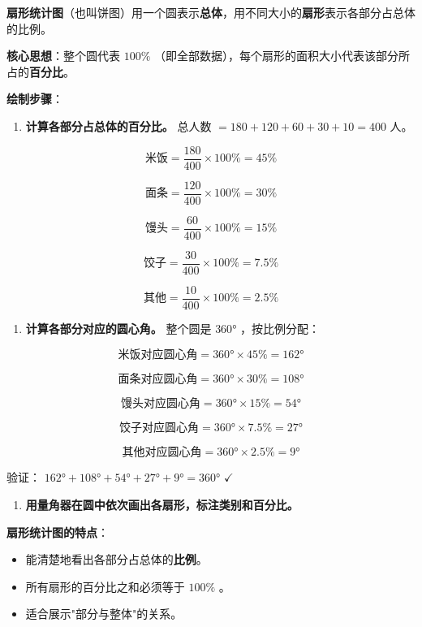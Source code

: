 \begin{understand}


\textbf{扇形统计图}（也叫饼图）用一个圆表示\textbf{总体}，用不同大小的\textbf{扇形}表示各部分占总体的比例。

\textbf{核心思想}：整个圆代表 $100\%$ （即全部数据），每个扇形的面积大小代表该部分所占的\textbf{百分比}。

\textbf{绘制步骤}：

\begin{enumerate}
  \item \textbf{计算各部分占总体的百分比。} 总人数 $= 180 + 120 + 60 + 30 + 10 = 400$ 人。
\end{enumerate}


\[
\text{米饭} = \frac{180}{400} \times 100\% = 45\%
\]


\[
\text{面条} = \frac{120}{400} \times 100\% = 30\%
\]


\[
\text{馒头} = \frac{60}{400} \times 100\% = 15\%
\]


\[
\text{饺子} = \frac{30}{400} \times 100\% = 7.5\%
\]


\[
\text{其他} = \frac{10}{400} \times 100\% = 2.5\%
\]


\begin{enumerate}
  \item \textbf{计算各部分对应的圆心角。} 整个圆是 $360°$ ，按比例分配：
\end{enumerate}


\[
\text{米饭对应圆心角} = 360° \times 45\% = 162°
\]


\[
\text{面条对应圆心角} = 360° \times 30\% = 108°
\]


\[
\text{馒头对应圆心角} = 360° \times 15\% = 54°
\]


\[
\text{饺子对应圆心角} = 360° \times 7.5\% = 27°
\]


\[
\text{其他对应圆心角} = 360° \times 2.5\% = 9°
\]


验证： $162° + 108° + 54° + 27° + 9° = 360°$ $\checkmark$

\begin{enumerate}
  \item \textbf{用量角器在圆中依次画出各扇形，标注类别和百分比。}
\end{enumerate}


\textbf{扇形统计图的特点}：
\begin{itemize}
  \item 能清楚地看出各部分占总体的\textbf{比例}。
  \item 所有扇形的百分比之和必须等于 $100\%$ 。
  \item 适合展示"部分与整体"的关系。
\end{itemize}



\end{understand}
